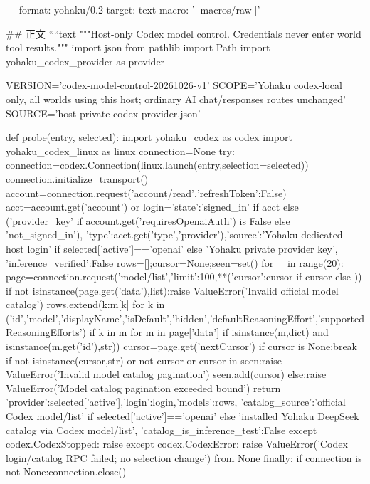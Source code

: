 ---
format: yohaku/0.2
target: text
macro: '[[macros/raw]]'
---

## 正文
````text
"""Host-only Codex model control. Credentials never enter world tool results."""
import json
from pathlib import Path
import yohaku_codex_provider as provider

VERSION='codex-model-control-20261026-v1'
SCOPE='Yohaku codex-local only, all worlds using this host; ordinary AI chat/responses routes unchanged'
SOURCE='host private codex-provider.json'

def probe(entry, selected):
    import yohaku_codex as codex
    import yohaku_codex_linux as linux
    connection=None
    try:
        connection=codex.Connection(linux.launch(entry,selection=selected))
        connection.initialize_transport()
        account=connection.request('account/read',{'refreshToken':False})
        acct=account.get('account') or {}
        login={'state':'signed_in' if acct else ('provider_key' if account.get('requiresOpenaiAuth') is False else 'not_signed_in'),
               'type':acct.get('type','provider'),'source':'Yohaku dedicated host login' if selected['active']=='openai' else 'Yohaku private provider key',
               'inference_verified':False}
        rows=[];cursor=None;seen=set()
        for _ in range(20):
            page=connection.request('model/list',{'limit':100,**({'cursor':cursor} if cursor else {})})
            if not isinstance(page.get('data'),list):raise ValueError('Invalid official model catalog')
            rows.extend({k:m[k] for k in ('id','model','displayName','isDefault','hidden','defaultReasoningEffort','supportedReasoningEfforts') if k in m} for m in page['data'] if isinstance(m,dict) and isinstance(m.get('id'),str))
            cursor=page.get('nextCursor')
            if cursor is None:break
            if not isinstance(cursor,str) or not cursor or cursor in seen:raise ValueError('Invalid model catalog pagination')
            seen.add(cursor)
        else:raise ValueError('Model catalog pagination exceeded bound')
        return {'provider':selected['active'],'login':login,'models':rows,
                'catalog_source':'official Codex model/list' if selected['active']=='openai' else 'installed Yohaku DeepSeek catalog via Codex model/list',
                'catalog_is_inference_test':False}
    except codex.CodexStopped:
        raise
    except codex.CodexError:
        raise ValueError('Codex login/catalog RPC failed; no selection change') from None
    finally:
        if connection is not None:connection.close()

